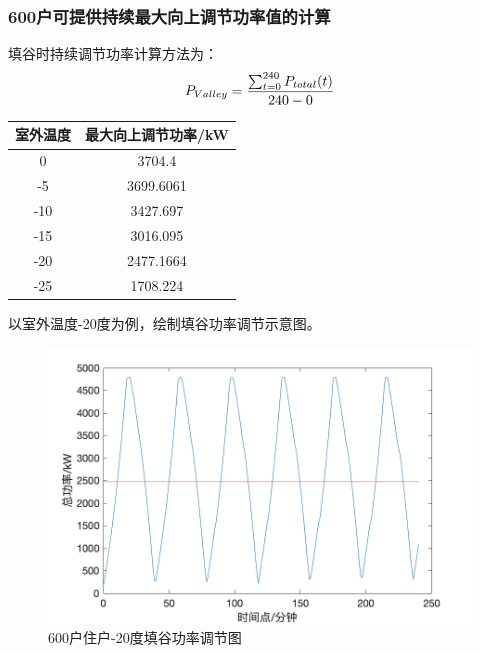 \documentclass[withoutpreface,bwprint]{cumcmthesis} %
\begin{document}
    \subsubsection{600户可提供持续最大向上调节功率值的计算}
    填谷时持续调节功率计算方法为：
    $$
    P_{Valley} =\frac{\sum_{t=0}^{240} P_{total}(t)}{240-0}  \\
    $$
        \begin{table}[H]
            \centering
     \begin{tabular}{|c|c|}\hline
 室外温度 &最大向上调节功率/kW \\ \hline
0	&  3704.4 \\ \hline
-5 &	3699.6061    \\ \hline
-10&	3427.697 \\ \hline
-15&   3016.095  \\ \hline
-20 &	2477.1664  \\ \hline
-25 &	1708.224 \\ \hline
\end{tabular}
\end{table}

以室外温度-20度为例，绘制填谷功率调节示意图。
\begin{figure}[H]
    \centering
        \includegraphics[width=1\textwidth]{figures/5-2-20.png}
    \caption{600户住户-20度填谷功率调节图}
    \label{fig:my_label}
    \end{figure}
\end{document}
